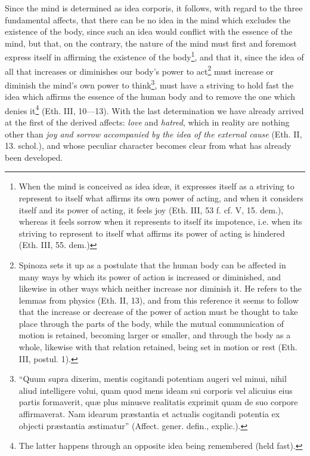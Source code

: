 \documentclass[12pt,a4paper,openany]{book}
\newcommand{\opage}[1]{\marginnote{\footnotesize\textit{[#1]}}}
\begin{document}
\opage{114}\setcounter{footnote}{0}Since the mind is determined as idea corporis, it follows,
with regard to the three fundamental affects, that there can be
no idea in the mind which excludes the existence of the body, since
such an idea would conflict with the essence of the mind, but that, on the
contrary, the nature of the mind must first and foremost express itself in
affirming the existence of the
body\footnote{When the mind is conceived as idea ideæ,
it expresses itself as a striving to represent to itself what
affirms its own power of acting, and when it considers itself
and its power of acting, it feels joy (Eth. III, 53 f. cf.
V, 15. dem.), whereas it feels sorrow when it
represents to itself its impotence, i.e. when its striving to
represent to itself what affirms its power of acting is hindered
(Eth. III, 55. dem.)}, and that it, since the idea of
all that increases or diminishes our body's power
to
act\footnote{Spinoza sets it up as a postulate that the
human body can be affected in many ways by
which its power of action is increased or diminished, and
likewise in other ways which neither increase nor
diminish it. He refers to the lemmas from
physics (Eth. II, 13), and from this reference it seems to
follow that the increase or decrease of the power of action
must be thought to take place through the parts of the body, while
the mutual communication of motion is retained, becoming
larger or smaller, and through the body as a whole, likewise
with that relation retained, being set in motion or
rest (Eth. III, postul. 1).} must increase or diminish the mind's own
power to
think\footnote{``Quum supra dixerim, mentis cogitandi
potentiam augeri vel minui, nihil aliud intelligere volui, quam
quod mens ideam sui corporis vel alicuius eius partis
formaverit, quæ plus minusve realitatis exprimit quam de suo
corpore affirmaverat. Nam idearum præstantia et actualis
cogitandi potentia ex objecti præstantia æstimatur'' (Affect.
gener. defin., explic.).}, must have a striving to hold
fast the idea which affirms the essence of the human body
and to remove the one which denies
it\footnote{The latter happens through an opposite idea being remembered
(held fast).} (Eth. III,
10---13). With the last determination we have already arrived
at the first of the derived affects: \emph{love} and
\emph{hatred}, which in reality are nothing other than \emph{joy
and sorrow accompanied by the idea of the external cause}
\opage{115} (Eth. II, 13. schol.), and whose peculiar character becomes clear
from what has already been developed.
\end{document}
